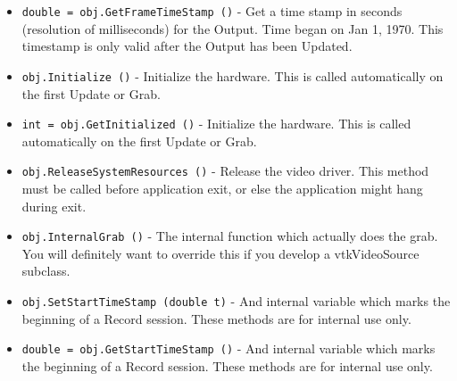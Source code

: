 \begin{itemize}
\item  \verb|double = obj.GetFrameTimeStamp ()| -  Get a time stamp in seconds (resolution of milliseconds) for
 the Output.  Time began on Jan 1, 1970.  This timestamp is only
 valid after the Output has been Updated.

\item  \verb|obj.Initialize ()| -  Initialize the hardware.  This is called automatically
 on the first Update or Grab.

\item  \verb|int = obj.GetInitialized ()| -  Initialize the hardware.  This is called automatically
 on the first Update or Grab.

\item  \verb|obj.ReleaseSystemResources ()| -  Release the video driver.  This method must be called before
 application exit, or else the application might hang during
 exit.  

\item  \verb|obj.InternalGrab ()| -  The internal function which actually does the grab.  You will
 definitely want to override this if you develop a vtkVideoSource
 subclass. 

\item  \verb|obj.SetStartTimeStamp (double t)| -  And internal variable which marks the beginning of a Record session.
 These methods are for internal use only.

\item  \verb|double = obj.GetStartTimeStamp ()| -  And internal variable which marks the beginning of a Record session.
 These methods are for internal use only.

\end{itemize}
